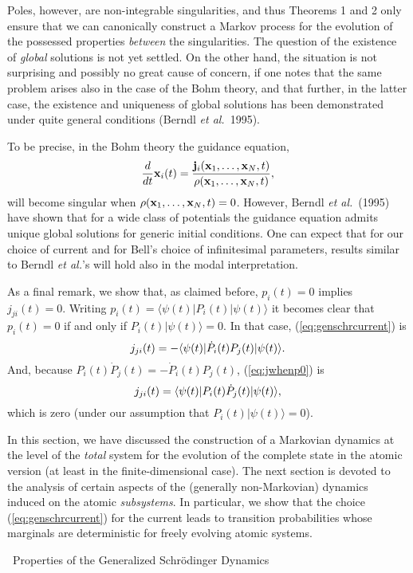 \documentclass[12pt]{article}
\newcommand{\be}{\vspace*{6pt} \begin{equation}}
\newcommand{\ee}{\vspace*{10pt} \end{equation}}
\renewcommand{\section}[1]{\addtocounter{section}{1}
                           \setcounter{subsection}{0}
                           \setcounter{subsubsection}{0}
                           \vspace{20pt}
                           \begin{center}
                           {\large \thesection \ #1}
                           \end{center}
                           \vspace{20pt}}
\newcommand{\bra}[1]{\langle #1\vert}                           %
\newcommand{\ket}[1]{\vert #1\rangle}                           %
\begin{document}
Poles, however, are non-integrable singularities, and thus Theorems 1 
and 2 only ensure that we can canonically construct a Markov process 
for the evolution of the possessed properties {\em between} the 
singularities.  The question of the existence of {\em global} 
solutions is not yet settled.  On the other hand, the situation is not 
surprising and possibly no great cause of concern, if one notes that 
the same problem arises also in the case of the Bohm theory, and that 
further, in the latter case, the existence and uniqueness of global 
solutions has been demonstrated under quite general conditions (Berndl 
{\em et al.}\ 1995).

To be precise, in the Bohm theory the guidance equation,
\be
  \frac{d}{dt}{\bf x}_i(t)
    =\frac{{\bf j}_i({\bf x}_1,\ldots,{\bf x}_N,t)}{\rho({\bf x}_1,
    \ldots,{\bf x}_N,t)},
\ee
will become singular when $\rho({\bf x}_1,\ldots,{\bf x}_N,t)=0$.  
However, Berndl {\em et al.}\ (1995) have shown that for a wide class 
of potentials the guidance equation admits unique global solutions for 
generic initial conditions.  One can expect that for our choice of 
current and for Bell's choice of infinitesimal parameters, results 
similar to Berndl {\em et al.}'s will hold also in the modal 
interpretation.

As a final remark, we show that, as claimed before, $p_i(t) = 0$ 
implies $j_{ji}(t) = 0$.  Writing 
$p_i(t)=\bra{\psi(t)}P_i(t)\ket{\psi(t)}$ it becomes clear that 
$p_i(t) = 0$ if and only if $P_i(t)\ket{\psi(t)} = 0$.  In that case, 
(\ref{eq:genschrcurrent}) is
\be
  \label{eq:jwhenp0}
  j_{ji}(t) = -\bra{\psi(t)}\dot{P}_i(t)P_j(t)\ket{\psi(t)}.
\ee
And, because $P_i(t)\dot{P}_j(t) = - \dot{P}_i(t)P_j(t)$,
(\ref{eq:jwhenp0}) is
\be
  j_{ji}(t) = \bra{\psi(t)}P_i(t)\dot{P}_j(t)\ket{\psi(t)},
\ee
which is zero (under our assumption that $P_i(t)\ket{\psi(t)} = 0$).

In this section, we have discussed the construction of a Markovian 
dynamics at the level of the {\em total} system for the evolution of 
the complete state in the atomic version (at least in the 
finite-dimensional case).  The next section is devoted to the analysis 
of certain aspects of the (generally non-Markovian) dynamics induced 
on the atomic {\em subsystems}.  In particular, we show that the 
choice (\ref{eq:genschrcurrent}) for the current leads to transition 
probabilities whose marginals are deterministic for freely evolving 
atomic systems.


\section{Properties of the Generalized Schr\"odinger Dynamics}
\end{document}
